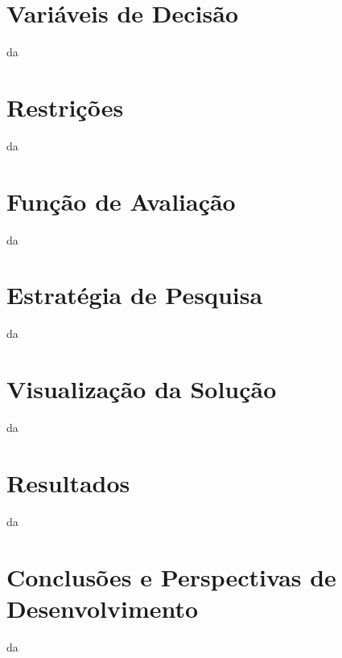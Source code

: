 \documentclass[runningheads,a4paper]{llncs}
\begin{document}
\section{Variáveis de Decisão}
da

\section{Restrições}
da

\section{Função de Avaliação}
da

\section{Estratégia de Pesquisa}
da

\section{Visualização da Solução}
da

\section{Resultados}
da

\section{Conclusões e Perspectivas de Desenvolvimento}
da
\end{document}
